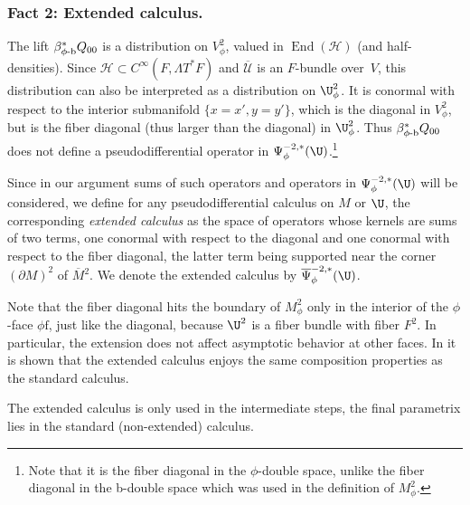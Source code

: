 \documentclass[JEP,XML,SOM,Unicode,NoFloatCountersInSection,published]{cedram}
\newcommand{\phib}{{\phi\textup{-}\bb}}
\theoremstyle{plain}
\theoremstyle{definition}
\newcommand{\Umathbar}{{\overline{\mathscr{U}}}}
\newcommand{\phif}{{\phi\mathrm{f}}}
\newcommand{\bb}{{\mathrm{b}}}
\DeclareMathOperator{\End}{End}
\newcommand{\Cinf}{C^\infty}
\newcommand{\Mbar}{{\overline{M}}}\let\M\Mbar
\newcommand{\Psibar}{\overline{\Psi}}
\begin{document}
\subsubsection*{Fact 2: Extended calculus.}
The lift $\beta_{\phib}^* Q_{00}$ is a distribution on $V^2_\phi$, valued in $\End(\mathscr{H})$
(and half-densities). Since $\mathscr{H}\!\subset\!\Cinf(F,\Lambda T^*F)$ and $\Umathbar$ is an $F$-bundle over~$V$, this distribution can also be interpreted as a distribution on $\U^2_\phi$. It is conormal with respect to the interior submanifold $\{x=x', y=y'\}$, which is the diagonal in $V^2_\phi$, but is the fiber diagonal (thus larger than the diagonal) in $\U^2_\phi$. Thus $\beta_{\phib}^* Q_{00}$ does not define a pseudodifferential operator in $\Psi^{-2, *}_\phi(\U)$.\footnote{Note that it is the fiber diagonal in the $\phi$-double space, unlike the fiber diagonal in the b-double space which was used in the definition of $M^2_\phi$.}

Since in our argument sums of such operators and operators in $\Psi^{-2,*}_\phi(\U)$ will be considered, we
define for any pseudodifferential calculus on $M$ or $\U$, the corresponding \textit{extended calculus} as
the space of operators whose kernels are sums of two terms, one conormal with respect to the diagonal and one conormal with respect to the fiber diagonal, the latter term being supported near the corner $(\partial M)^2$ of $\Mbar{}^2$.
We denote the extended calculus by $\Psibar^{-2,*}_\phi(\U)$.

Note that the fiber diagonal hits the boundary of $M^2_\phi$ only in the interior of the $\phi$\nobreakdash-face $\phif$,
just like the diagonal, because $\U^2$ is a fiber bundle with fiber $F^2$. In particular, the extension
does not affect asymptotic behavior at other faces. In \cite[Prop.\,2]{grieser-para} it is shown that the
extended calculus enjoys the same composition properties as the standard calculus.

The extended calculus is only used in the intermediate steps, the final parametrix lies in the standard (non-extended) calculus.
\end{document}
